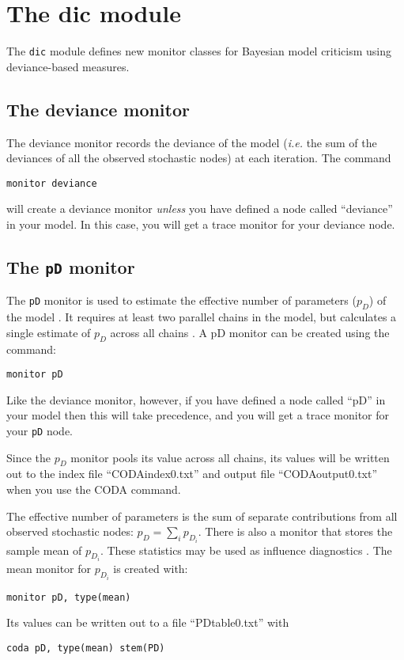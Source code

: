 \documentclass[11pt, a4paper, titlepage]{report}
\begin{document}
\section{The dic module}

The \verb+dic+ module defines new monitor classes for Bayesian model
criticism using deviance-based measures. 

\subsection{The deviance monitor}

The deviance monitor records the deviance of the model ({\em i.e.} the
sum of the deviances of all the observed stochastic nodes) at each
iteration. The command
\begin{verbatim}
monitor deviance
\end{verbatim}
will create a deviance monitor {\em unless} you have defined a node
called ``deviance'' in your model. In this case, you will get a trace
monitor for your deviance node.

\subsection{The \texttt{pD} monitor}

The \verb+pD+ monitor is used to estimate the effective number of
parameters ($p_D$) of the model \cite{spiegelhalter:etal:2002}. It
requires at least two parallel chains in the model, but calculates
a single estimate of $p_D$ across all chains \cite{plummer:2002}.
A pD monitor can be created using the command:
\begin{verbatim}
monitor pD
\end{verbatim}
Like the deviance monitor, however, if you have defined a node called
``pD'' in your model then this will take precedence, and you will get
a trace monitor for your \verb+pD+ node.

Since the $p_D$ monitor pools its value across all chains, its values
will be written out to the index file ``CODAindex0.txt'' and
output file ``CODAoutput0.txt'' when you use the CODA command.

The effective number of parameters is the sum of separate contributions
from all observed stochastic nodes: $p_D = \sum_i p_{D_i}$. There is
also a monitor that stores the sample mean of $p_{D_i}$. These statistics
may be used as influence diagnostics \cite{spiegelhalter:etal:2002}.
The mean monitor for $p_{D_i}$ is created with:
\begin{verbatim}
monitor pD, type(mean)
\end{verbatim}
Its values can be written out to a file ``PDtable0.txt'' with
\begin{verbatim}
coda pD, type(mean) stem(PD)
\end{verbatim}
\end{document}
